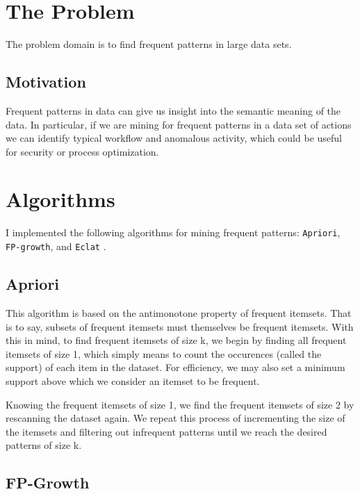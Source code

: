 \documentclass[11pt]{article}
\begin{document}
\begin{multicols}{2} %


\section{The Problem}

The problem domain is to find frequent patterns in large data sets.

\subsection{Motivation}

Frequent patterns in data can give us insight into the semantic
meaning of the data.  In particular, if we are mining for frequent
patterns in a data set of actions we can identify typical workflow and
anomalous activity, which could be useful for security or process
optimization.

\section{Algorithms}

I implemented the following algorithms for mining frequent patterns:
\texttt{Apriori}, \texttt{FP-growth}, and \texttt{Eclat}
\cite{Han2007,fpmlecture}.

\subsection{Apriori}

This algorithm is based on the antimonotone property of frequent
itemsets.  That is to say, subsets of frequent itemsets must
themselves be frequent itemsets.  With this in mind, to find frequent
itemsets of size k, we begin by finding all frequent itemsets of size
1, which simply means to count the occurences (called the support) of
each item in the dataset.  For efficiency, we may also set a minimum
support above which we consider an itemset to be frequent.

Knowing the frequent itemsets of size 1, we find the frequent itemsets
of size 2 by rescanning the dataset again.  We repeat this process of
incrementing the size of the itemsets and filtering out infrequent
patterns until we reach the desired patterns of size k.

\subsection{FP-Growth}


\end{multicols}
\end{document}
